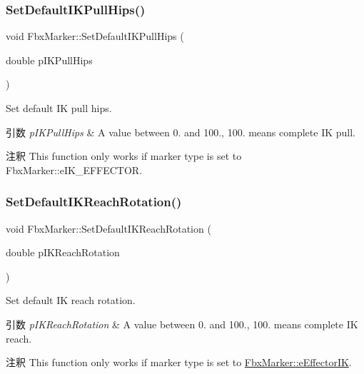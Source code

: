 \subsubsection{\texorpdfstring{Set\+Default\+I\+K\+Pull\+Hips()}{SetDefaultIKPullHips()}}
{\footnotesize\ttfamily void Fbx\+Marker\+::\+Set\+Default\+I\+K\+Pull\+Hips (\begin{DoxyParamCaption}\item[{double}]{p\+I\+K\+Pull\+Hips }\end{DoxyParamCaption})}

Set default IK pull hips. 
\begin{DoxyParams}{引数}
{\em p\+I\+K\+Pull\+Hips} & A value between 0. and 100., 100. means complete IK pull. \\
\hline
\end{DoxyParams}
\begin{DoxyRemark}{注釈}
This function only works if marker type is set to Fbx\+Marker\+::e\+I\+K\+\_\+\+E\+F\+F\+E\+C\+T\+OR. 
\end{DoxyRemark}
\mbox{\label{class_fbx_marker_af4a0f96f399ceb4509d47885aa0f6edf}} 
\subsubsection{\texorpdfstring{Set\+Default\+I\+K\+Reach\+Rotation()}{SetDefaultIKReachRotation()}}
{\footnotesize\ttfamily void Fbx\+Marker\+::\+Set\+Default\+I\+K\+Reach\+Rotation (\begin{DoxyParamCaption}\item[{double}]{p\+I\+K\+Reach\+Rotation }\end{DoxyParamCaption})}

Set default IK reach rotation. 
\begin{DoxyParams}{引数}
{\em p\+I\+K\+Reach\+Rotation} & A value between 0. and 100., 100. means complete IK reach. \\
\hline
\end{DoxyParams}
\begin{DoxyRemark}{注釈}
This function only works if marker type is set to \hyperlink{class_fbx_marker_ad1e38753dce9a2212df0364466d9f617a6eb5815d51c3fd66217211a2a4e70538}{Fbx\+Marker\+::e\+Effector\+IK}. 
\end{DoxyRemark}
\mbox{\label{class_fbx_marker_a895e5673867ab2daf2fc5b42efd571f8}} 
